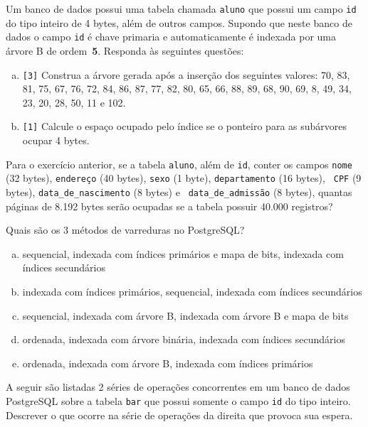 Um banco de dados possui uma tabela chamada {\tt aluno}
que possui um campo {\tt id} do tipo inteiro de 4 bytes, além de
outros campos. Supondo que neste banco de dados o campo {\tt id} é
chave primaria e automaticamente é indexada por uma árvore B de
ordem~{\bf 5}.  Responda às seguintes questões:

\begin{enumerate}[a)]
\item {\tt [3]} Construa a árvore gerada após a inserção dos
  seguintes valores: 70, 83, 81, 75, 67, 76, 72, 84, 86, 87, 77, 82,
  80, 65, 66, 88, 89, 68, 90, 69, 8, 49, 34, 23, 20, 28, 50, 11 e 102.

\item {\tt [1]} Calcule o espaço ocupado pelo índice se o ponteiro
  para as subárvores ocupar 4 bytes.
\end{enumerate}

 Para o exercício anterior, se a tabela {\tt aluno}, além
de {\tt id}, conter os campos {\tt nome} (32 bytes), {\tt endereço}
(40 bytes), {\tt sexo} (1 byte), {\tt departamento} (16 bytes), {\tt
  CPF} (9 bytes), {\tt data\_de\_nascimento} (8 bytes) e {\tt
  data\_de\_admissão} (8 bytes), quantas páginas de 8.192 bytes serão
ocupadas se a tabela possuir 40.000 registros?


 Quais são os 3 métodos de varreduras no PostgreSQL?

\begin{enumerate}[a)]
\item sequencial, indexada com índices primários e mapa de bits, indexada com índices secundários
\item indexada com índices primários, sequencial, indexada com índices secundários
\item sequencial, indexada com árvore B, indexada com árvore B e mapa de bits
\item ordenada, indexada com árvore binária, indexada com índices secundários
\item ordenada, indexada com árvore B, indexada com índices primários
\end{enumerate}

 A seguir são listadas 2 séries de operações concorrentes
em um banco de dados PostgreSQL sobre a tabela {\tt bar} que
possui somente o campo {\tt id} do tipo inteiro. Descrever o que
ocorre na série de operações da direita que provoca sua espera.

